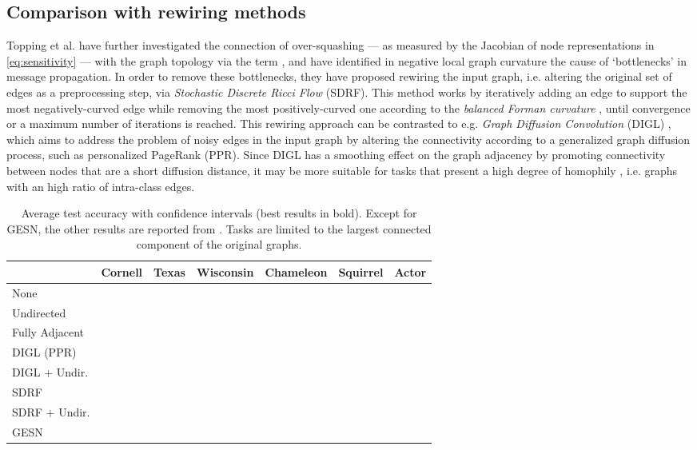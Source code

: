 \documentclass[final,5p,times,twocolumn]{elsarticle}
\begin{document}
\subsection{Comparison with rewiring methods}
\label{sec:experiments-rewiring}

Topping et al. \cite{Topping2022} have further investigated the connection of over-squashing --- as measured by the Jacobian of node representations in \eqref{eq:sensitivity} --- with the graph topology via the term , and have identified in negative local graph curvature the cause of `bottlenecks' in message propagation.
In order to remove these bottlenecks, they have proposed rewiring the input graph, i.e. altering the original set of edges as a preprocessing step, via \textsl{Stochastic Discrete Ricci Flow} (SDRF).
This method works by iteratively adding an edge to support the most negatively-curved edge while removing the most positively-curved one according to the \emph{balanced Forman curvature} \citep{Topping2022}, until convergence or a maximum number of iterations is reached.
This rewiring approach can be contrasted to e.g. \textsl{Graph Diffusion Convolution} (DIGL) \cite{Gasteiger2019}, which aims to address the problem of noisy edges in the input graph by altering the connectivity according to a generalized graph diffusion process, such as personalized PageRank (PPR).
Since DIGL has a smoothing effect on the graph adjacency by promoting connectivity between nodes that are a short diffusion distance, it may be more suitable for tasks that present a high degree of homophily \citep{Topping2022}, i.e. graphs with an high ratio of intra-class edges.

\begin{table*}
	\centering
	\begin{tabular}{lcccccc}
		\toprule
		& \textbf{Cornell} & \textbf{Texas} & \textbf{Wisconsin} & \textbf{Chameleon} & \textbf{Squirrel} & \textbf{Actor} \\
		\midrule
		None &  &  &  &  &  &  \\
		Undirected &  &  &  &  &  &  \\
		Fully Adjacent &  &  &  &  &  &  \\
		\midrule
		DIGL (PPR) &  &  &  &  &  &  \\
		DIGL + Undir. &  &  &  &  &  &  \\
		\midrule
		SDRF &  &  &  &  &  &  \\
		SDRF + Undir. &  &  &  &  &  &  \\
		\midrule
		GESN &  &  &  &  &  &  \\
		\bottomrule
	\end{tabular}
\caption{Average test accuracy with  confidence intervals (best results in bold). Except for GESN, the other results are reported from \cite{Topping2022}. Tasks are limited to the largest connected component of the original graphs.}
\label{tab:experiments-rewiring}
\end{table*}
\end{document}
